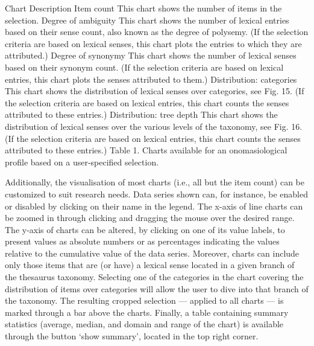 Chart	Description
Item count	This chart shows the number of items in the selection.
Degree of ambiguity	This chart shows the number of lexical entries based on their sense count, also known as the degree of polysemy. (If the selection criteria are based on lexical senses, this chart plots the entries to which they are attributed.)
Degree of synonymy	This chart shows the number of lexical senses based on their synonym count. (If the selection criteria are based on lexical entries, this chart plots the senses attributed to them.)
Distribution: 
categories	This chart shows the distribution of lexical senses over categories, see Fig. 15. (If the selection criteria are based on lexical entries, this chart counts the senses attributed to these entries.)
Distribution: 
tree depth	This chart shows the distribution of lexical senses over the various levels of the taxonomy, see Fig. 16. (If the selection criteria are based on lexical entries, this chart counts the senses attributed to these entries.)
Table 1. Charts available for an onomasiological profile based on a user-specified selection.

Additionally, the visualisation of most charts (i.e., all but the item count) can be customized to suit research needs. Data series shown can, for instance, be enabled or disabled by clicking on their name in the legend. The x-axis of line charts can be zoomed in through clicking and dragging the mouse over the desired range. The y-axis of charts can be altered, by clicking on one of its value labels, to present values as absolute numbers or as percentages indicating the values relative to the cumulative value of the data series. Moreover, charts can include only those items that are (or have) a lexical sense located in a given branch of the thesaurus taxonomy. Selecting one of the categories in the chart covering the distribution of items over categories will allow the user to dive into that branch of the taxonomy. The resulting cropped selection — applied to all charts — is marked through a bar above the charts. Finally, a table containing summary statistics (average, median, and domain and range of the chart) is available through the button ‘show summary’, located in the top right corner.


